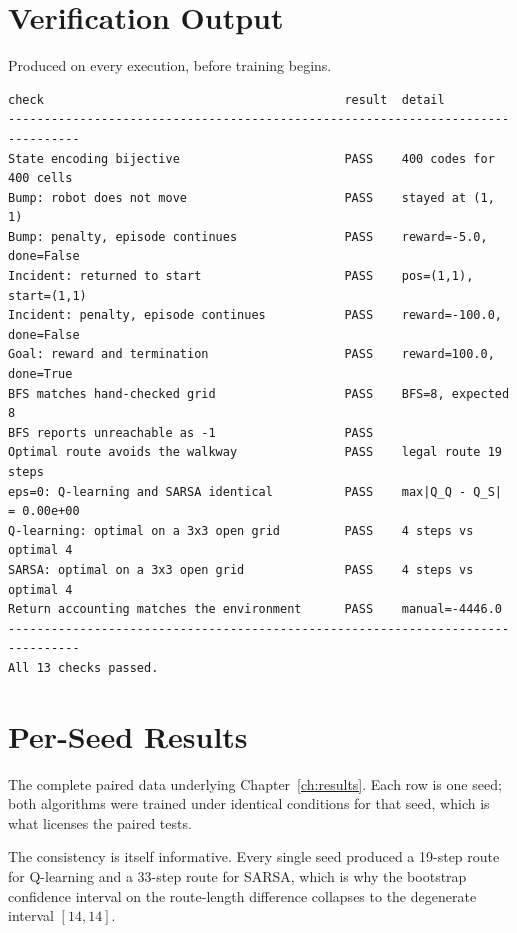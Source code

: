 \chapter{Verification Output}
\label{app:verification}

Produced on every execution, before training begins.

{\small
\begin{verbatim}
check                                          result  detail
--------------------------------------------------------------------------------
State encoding bijective                       PASS    400 codes for 400 cells
Bump: robot does not move                      PASS    stayed at (1, 1)
Bump: penalty, episode continues               PASS    reward=-5.0, done=False
Incident: returned to start                    PASS    pos=(1,1), start=(1,1)
Incident: penalty, episode continues           PASS    reward=-100.0, done=False
Goal: reward and termination                   PASS    reward=100.0, done=True
BFS matches hand-checked grid                  PASS    BFS=8, expected 8
BFS reports unreachable as -1                  PASS
Optimal route avoids the walkway               PASS    legal route 19 steps
eps=0: Q-learning and SARSA identical          PASS    max|Q_Q - Q_S| = 0.00e+00
Q-learning: optimal on a 3x3 open grid         PASS    4 steps vs optimal 4
SARSA: optimal on a 3x3 open grid              PASS    4 steps vs optimal 4
Return accounting matches the environment      PASS    manual=-4446.0
--------------------------------------------------------------------------------
All 13 checks passed.
\end{verbatim}}


\chapter{Per-Seed Results}
\label{app:perseed}

The complete paired data underlying Chapter~\ref{ch:results}. Each row is one seed; both algorithms
were trained under identical conditions for that seed, which is what licenses the paired tests.

The consistency is itself informative. Every single seed produced a 19-step route for Q-learning and
a 33-step route for SARSA, which is why the bootstrap confidence interval on the route-length
difference collapses to the degenerate interval $[14, 14]$.

